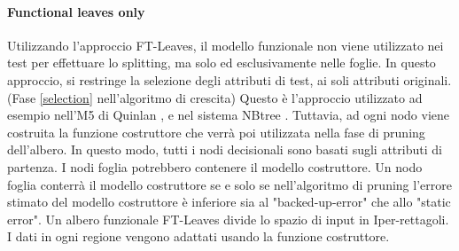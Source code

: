 \paragraph{Functional leaves only}
Utilizzando l'approccio FT-Leaves, il modello funzionale non viene utilizzato nei test per effettuare lo splitting, ma solo ed esclusivamente nelle foglie. In questo approccio, si restringe la selezione degli attributi di test, ai soli attributi originali. (Fase \ref{selection} nell'algoritmo di crescita)
Questo è l'approccio utilizzato ad esempio nell'M5 di Quinlan \cite{Quinlan93combininginstance-based}, e nel sistema NBtree \cite{Kohavi1996}. 
Tuttavia, ad ogni nodo viene costruita la funzione costruttore che verrà poi utilizzata nella fase di pruning dell'albero. In questo modo, tutti i nodi decisionali sono basati sugli attributi di partenza. I nodi foglia potrebbero contenere il modello costruttore. Un nodo foglia conterrà il modello costruttore se e solo se nell'algoritmo di pruning l'errore stimato del modello costruttore è inferiore sia al "backed-up-error" che allo "static error". Un albero funzionale FT-Leaves divide lo spazio di input in Iper-rettagoli. I dati in ogni regione vengono adattati usando la funzione costruttore.

